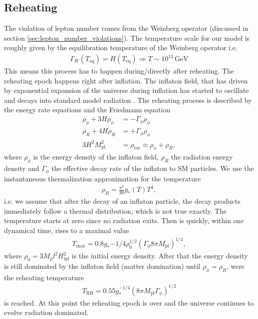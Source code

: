 \documentclass[13pt,a4paper,titlepage]{article}
\begin{document}
\subsection{Reheating}
\label{sec:reheating}
The violation of lepton number comes from the Weinberg operator (discussed in section \ref{sec:lepton_number_violations}).
The temperature scale for our model is roughly given by the equilibration temperature of the Weinberg operator i.e.
\begin{align}
    \Gamma_W(T_\mathrm{eq}) = H(T_\mathrm{eq}) \Rightarrow T \sim 10^{13} \, \mathrm{GeV}
\end{align}
This means this process has to happen during/directly after reheating. The reheating epoch happens right after inflation. The inflaton field, that has driven by exponential expansion of the universe during inflation has started to oscillate and decays into standard model radiation  \cite[sec. 8.3]{the_early_universe_kolb_and_turner}.
The reheating process is described by the energy rate equations and the Friedmann equation \cite[eq. 8.29, 8.31]{the_early_universe_kolb_and_turner}
\begin{align}
    \label{eq:reheating_equations}
    \dot{\rho_\phi} + 3 H \rho_\phi &= - \Gamma_\phi \rho_\phi \\
    \dot{\rho_R} + 4 H \rho_R &= + \Gamma_\phi \rho_\phi \\
    3 H^2 M_\mathrm{pl}^2 &= \rho_\mathrm{tot} \approx \rho_\phi + \rho_R,
\end{align}
where $\rho_\phi$ is the energy density of the inflaton field, $\rho_R$ the radiation energy density and $\Gamma_\phi$ the effective decay rate of the inflaton to SM particles.
We use the instantaneous thermalization approximation for the temperature
\begin{align}
    \rho_R = \frac{\pi^2}{30} g_{*}(T) T^4,
\end{align}
i.e. we assume that after the decay of an inflaton particle, the decay products immediately follow a thermal distribution, which is not true exactly.
The temperature starts at zero since no radiation exits. Then is quickly, within one dynamical time, rises to a maximal
value \cite[eq. 8.33]{the_early_universe_kolb_and_turner}
\begin{align}
    T_\mathrm{max} = 0.8 g_*{-1/4} \rho_0^{1/2} (\Gamma_\phi 8 \pi M_\mathrm{pl})^{1/4},
\end{align}
where $\rho_0 = 3 M_pl^2 H_\mathrm{inf}^2$ is the initial energy density.
After that the energy density is still dominated by the inflaton field (matter domination) until
$\rho_\phi = \rho_R$, were the reheating temperature \cite[eq. 8.34]{the_early_universe_kolb_and_turner}
\begin{align}
    T_\mathrm{RH} = 0.55 g_*^{-1/4} (8 \pi M_\mathrm{pl} \Gamma_\phi)^{1/2}
\end{align}
is reached. At this point the reheating epoch is over and the universe continues to evolve radiation dominated.
\end{document}

